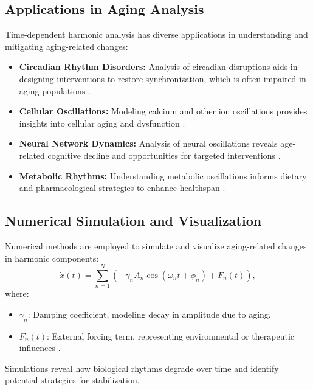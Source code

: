 \documentclass{article}
\theoremstyle{plain}
\begin{document}
\subsection{Applications in Aging Analysis}
Time-dependent harmonic analysis has diverse applications in understanding and mitigating aging-related changes:
\begin{itemize}
    \item \textbf{Circadian Rhythm Disorders:} Analysis of circadian disruptions aids in designing interventions to restore synchronization, which is often impaired in aging populations \cite{circadianRhythms2022}.
    \item \textbf{Cellular Oscillations:} Modeling calcium and other ion oscillations provides insights into cellular aging and dysfunction \cite{cellOscillations2023}.
    \item \textbf{Neural Network Dynamics:} Analysis of neural oscillations reveals age-related cognitive decline and opportunities for targeted interventions \cite{neuralAging2022}.
    \item \textbf{Metabolic Rhythms:} Understanding metabolic oscillations informs dietary and pharmacological strategies to enhance healthspan \cite{metabolicRhythms2023}.
\end{itemize}

\subsection{Numerical Simulation and Visualization}
Numerical methods are employed to simulate and visualize aging-related changes in harmonic components:
\begin{equation}
\dot{x}(t) = \sum_{n=1}^{N} \left(-\gamma_n A_n \cos(\omega_n t + \phi_n) + F_n(t) \right),
\end{equation}
where:
\begin{itemize}
    \item $\gamma_n$: Damping coefficient, modeling decay in amplitude due to aging.
    \item $F_n(t)$: External forcing term, representing environmental or therapeutic influences \cite{agingSimulations2023}.
\end{itemize}
Simulations reveal how biological rhythms degrade over time and identify potential strategies for stabilization.
\end{document}
